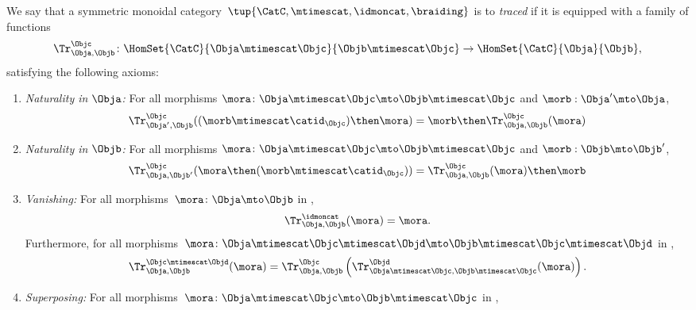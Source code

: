 \begin{ctdefinition}
    \label{def:traced-monoidal-cat}
    \label{def:traced-monoidal-category}
    We say that a symmetric monoidal category~$\tup{\CatC,\mtimescat,\idmoncat, \braiding}$ is  to \emph{traced} if it is equipped with a family of functions
    \begin{equation}
        \Tr_{\Obja,\Objb}^\Objc\colon \HomSet{\CatC}{\Obja \mtimescat \Objc}{\Objb\mtimescat \Objc}\to \HomSet{\CatC}{\Obja}{\Objb},
    \end{equation}
    satisfying the following axioms:
    \begin{enumerate}
        \item \emph{Naturality in $\Obja$:} For all morphisms $\mora\colon \Obja\mtimescat \Objc \mto \Objb\mtimescat \Objc$ and $\morb : \Obja' \mto \Obja$,
              \begin{equation}
                  \Tr_{\Obja', \Objb}^\Objc ( (\morb \mtimescat \catid_\Objc) \then \mora) = \morb \then \Tr_{\Obja, \Objb}^\Objc (\mora)
              \end{equation}
        \item \emph{Naturality in $\Objb$:} For all morphisms $\mora\colon \Obja\mtimescat \Objc \mto \Objb\mtimescat \Objc$ and $\morb : \Objb \mto \Objb'$,
              \begin{equation}
                  \Tr_{\Obja, \Objb'}^\Objc ( \mora \then (\morb \mtimescat \catid_\Objc) ) =  \Tr_{\Obja, \Objb}^\Objc (\mora) \then \morb
              \end{equation}
        \item \emph{Vanishing:} For all morphisms~$\mora \colon \Obja\mto \Objb$ in \CatC,
              \begin{equation}
                  \label{eq:vanishing_1}
                  \Tr_{\Obja,\Objb}^\idmoncat (\mora)=\mora.
              \end{equation}
              Furthermore, for all morphisms~$\mora \colon \Obja\mtimescat \Objc \mtimescat \Objd \mto \Objb\mtimescat \Objc \mtimescat \Objd$ in \CatC,
              \begin{equation}
                  \label{eq:vanishing_2}
                  \Tr_{\Obja,\Objb}^{\Objc\mtimescat \Objd}(\mora)=\Tr_{\Obja,\Objb}^\Objc\left(
                  \Tr_{\Obja \mtimescat \Objc , \Objb \mtimescat \Objc}^\Objd(\mora)\right).
              \end{equation}
        \item \emph{Superposing:}
              For all morphisms~$\mora\colon \Obja\mtimescat \Objc \mto \Objb\mtimescat \Objc$ in \CatC,

\end{enumerate}
\end{ctdefinition}
